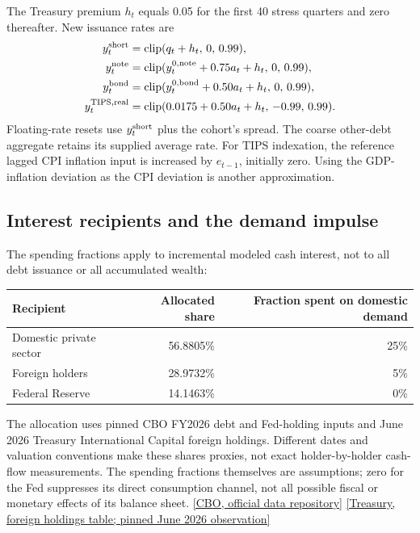 \documentclass[11pt,letterpaper]{article}
\newcommand{\src}[2]{\href{#1}{#2}}
\begin{document}
The Treasury premium \(h_t\) equals 0.05 for the first 40 stress quarters and
zero thereafter. New issuance rates are
\begin{align}
 y^{\rm short}_t&=\operatorname{clip}(q_t+h_t,\,0,\,0.99),\\
 y^{\rm note}_t&=\operatorname{clip}(y^{0,\rm note}_t+0.75a_t+h_t,\,0,\,0.99),\\
 y^{\rm bond}_t&=\operatorname{clip}(y^{0,\rm bond}_t+0.50a_t+h_t,\,0,\,0.99),\\
 y^{\rm TIPS,real}_t&=\operatorname{clip}(0.0175+0.50a_t+h_t,\,-0.99,\,0.99).
\end{align}
Floating-rate resets use \(y^{\rm short}_t\) plus the cohort's spread.
The coarse other-debt aggregate retains its supplied average rate.
For TIPS indexation, the reference lagged CPI inflation input is increased by
\(e_{t-1}\), initially zero. Using the GDP-inflation deviation as the CPI
deviation is another approximation.

\subsection*{Interest recipients and the demand impulse}

The spending fractions apply to incremental modeled cash interest, not
to all debt issuance or all accumulated wealth:
\begin{center}
\small
\begin{tabular}{lrr}
\toprule
Recipient & Allocated share & Fraction spent on domestic demand\\
\midrule
Domestic private sector & 56.8805\% & 25\%\\
Foreign holders & 28.9732\% & 5\%\\
Federal Reserve & 14.1463\% & 0\%\\
\bottomrule
\end{tabular}
\end{center}

The allocation uses pinned CBO FY2026 debt and Fed-holding inputs and
June 2026 Treasury International Capital foreign holdings. Different dates
and valuation conventions make these shares proxies, not exact holder-by-holder
cash-flow measurements. The spending fractions themselves are assumptions;
zero for the Fed suppresses its direct consumption channel, not all possible
fiscal or monetary effects of its balance sheet.
\src{https://github.com/US-CBO/cbo-data}{[CBO, official data repository]}
\src{https://ticdata.treasury.gov/resource-center/data-chart-center/tic/Documents/slt_table5.html}
{[Treasury, foreign holdings table; pinned June 2026 observation]}
\end{document}
